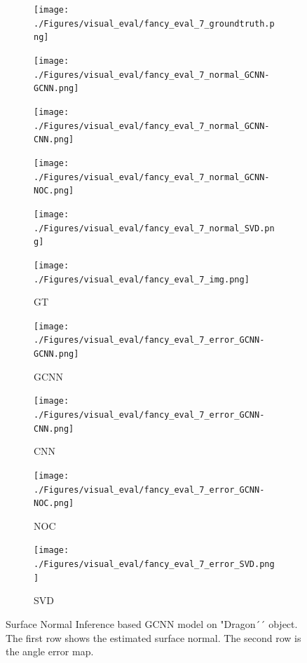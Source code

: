 \documentclass[border=15pt, multi, tikz]{article}
\begin{document}
\begin{figure}[H]
	\centering
	\begin{subfigure}[b]{0.18\linewidth}
		\texttt{[image: ./Figures/visual\_eval/fancy\_eval\_7\_groundtruth.png]}
	\end{subfigure}
	\begin{subfigure}[b]{0.18\linewidth}
		\texttt{[image: ./Figures/visual\_eval/fancy\_eval\_7\_normal\_GCNN-GCNN.png]}
	\end{subfigure}
	\begin{subfigure}[b]{0.18\linewidth}
		\texttt{[image: ./Figures/visual\_eval/fancy\_eval\_7\_normal\_GCNN-CNN.png]}
	\end{subfigure}
	\begin{subfigure}[b]{0.18\linewidth}
		\texttt{[image: ./Figures/visual\_eval/fancy\_eval\_7\_normal\_GCNN-NOC.png]}
	\end{subfigure}
	\begin{subfigure}[b]{0.18\linewidth}
		\texttt{[image: ./Figures/visual\_eval/fancy\_eval\_7\_normal\_SVD.png]}
	\end{subfigure}
	
	\begin{subfigure}[b]{0.18\linewidth}
		\texttt{[image: ./Figures/visual\_eval/fancy\_eval\_7\_img.png]}
		\caption{GT}
	\end{subfigure}
	\begin{subfigure}[b]{0.18\linewidth}
		\texttt{[image: ./Figures/visual\_eval/fancy\_eval\_7\_error\_GCNN-GCNN.png]}
		\caption{GCNN}
	\end{subfigure}
	\begin{subfigure}[b]{0.18\linewidth}
		\texttt{[image: ./Figures/visual\_eval/fancy\_eval\_7\_error\_GCNN-CNN.png]}
		\caption{CNN}
	\end{subfigure}
	\begin{subfigure}[b]{0.18\linewidth}
		\texttt{[image: ./Figures/visual\_eval/fancy\_eval\_7\_error\_GCNN-NOC.png]}
		\caption{NOC}
	\end{subfigure}
	\begin{subfigure}[b]{0.18\linewidth}
		\texttt{[image: ./Figures/visual\_eval/fancy\_eval\_7\_error\_SVD.png]}
		\caption{SVD}
	\end{subfigure}
	
	
	\caption{Surface Normal Inference based GCNN model on "Dragon´´ object. The first row shows the estimated surface normal. The second row is the angle error map.}
	\label{fig:gcnn-eval}
\end{figure}
\end{document}
